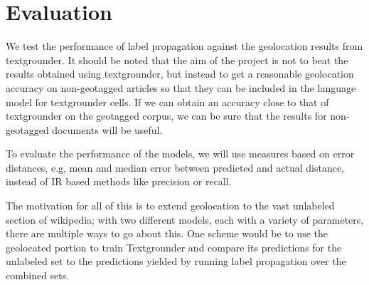 \documentclass[11pt]{article}
\begin{document}
\section{Evaluation}
We test the performance of label propagation against the geolocation results from textgrounder. 
It should be noted that the aim of the project is not to beat the results obtained using textgrounder,
but instead to get a reasonable geolocation accuracy on non-geotagged articles 
so that they can be included in the language model for textgrounder cells. 
If we can obtain an accuracy close to that of textgrounder on the geotagged corpus, 
we can be sure that the results for non-geotagged documents will be useful.


To evaluate the performance of the models, we will use measures based on error distances, 
e.g, mean and median error between predicted and actual distance,  
instead of IR based methods like precision or recall.

\par
The motivation for all of this is to extend geolocation to the vast unlabeled
section of wikipedia; with two different models, each with a variety of
parameters, there are multiple ways to go about this.
One scheme would be to use the geolocated portion to train Textgrounder and
compare its predictions for the unlabeled set to the predictions yielded by
running label propagation over the combined sets.



\end{document}
